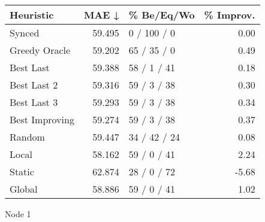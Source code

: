 \begin{tabular}{lrlr}
\toprule
\textbf{Heuristic} & \textbf{MAE ↓} & \textbf{\% Be/Eq/Wo} & \textbf{\% Improv.} \\
\midrule
            Synced &         59.495 &          0 / 100 / 0 &                0.00 \\
     Greedy Oracle &         59.202 &          65 / 35 / 0 &                0.49 \\
         Best Last &         59.388 &          58 / 1 / 41 &                0.18 \\
       Best Last 2 &         59.316 &          59 / 3 / 38 &                0.30 \\
       Best Last 3 &         59.293 &          59 / 3 / 38 &                0.34 \\
    Best Improving &         59.274 &          59 / 3 / 38 &                0.37 \\
            Random &         59.447 &         34 / 42 / 24 &                0.08 \\
             Local &         58.162 &          59 / 0 / 41 &                2.24 \\
            Static &         62.874 &          28 / 0 / 72 &               -5.68 \\
            Global &         58.886 &          59 / 0 / 41 &                1.02 \\
\bottomrule
\end{tabular}
\caption{Node 1}
\label{tab:non_lr01_le1_bs4_1}
